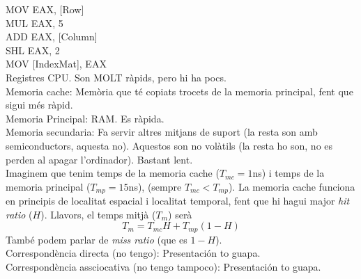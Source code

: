 \documentclass[../main.tex]{subfiles}
\begin{document}
    MOV EAX, [Row]\\
    MUL EAX, 5\\
    ADD EAX, [Column]\\
    SHL EAX, 2\\
    MOV [IndexMat], EAX\\
    
    Registres CPU. Son MOLT ràpids, pero hi ha pocs.\\
    Memoria cache: Memòria que té copiats trocets de la memoria principal, fent que sigui més ràpid.\\
    Memoria Principal: RAM. Es ràpida.\\
    Memoria secundaria: Fa servir altres mitjans de suport (la resta son amb semiconductors, aquesta no). Aquestos son no volàtils (la resta ho son, no es perden al apagar l'ordinador). Bastant lent.\\
    Imaginem que tenim temps de la memoria cache ($T_{mc} = 1$ns) i temps de la memoria principal ($T_{mp} = 15$ns), (sempre $T_{mc} < T_{mp}$). La memoria cache funciona en principis de localitat espacial i localitat temporal, fent que hi hagui major \textit{hit ratio} ($H$). Llavors, el temps mitjà ($T_m$) serà
    \begin{displaymath}
        T_m = T_{mc}H + T_{mp}(1-H)
    \end{displaymath}
    També podem parlar de \textit{miss ratio} (que es $1-H$).\\
    Correspondència directa (no tengo): Presentación to guapa.\\
    Correspondència assciocativa (no tengo tampoco): Presentación to guapa.
\end{document}
